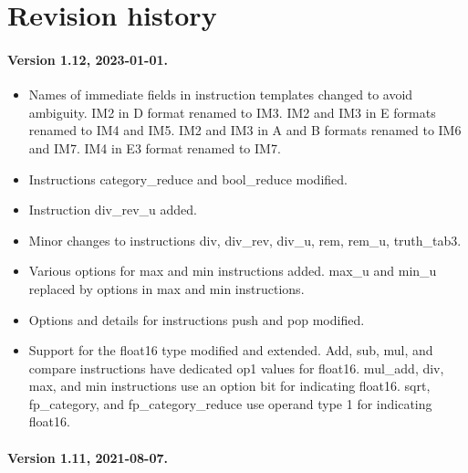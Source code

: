 \documentclass[forwardcom.tex]{subfiles}
\begin{document}
\RaggedRight

\chapter{Revision history}

\subsubsection{Version 1.12, 2023-01-01.}
\begin{itemize}
\item Names of immediate fields in instruction templates changed to avoid ambiguity. IM2 in D format renamed to IM3. IM2 and IM3 in E formats renamed to IM4 and IM5. IM2 and IM3 in A and B formats renamed to IM6 and IM7. IM4 in E3 format renamed to IM7.
\item Instructions category\_reduce and bool\_reduce modified.
\item Instruction div\_rev\_u added.
\item Minor changes to instructions div, div\_rev, div\_u, rem, rem\_u, truth\_tab3.
\item Various options for max and min instructions added. max\_u and min\_u replaced by options in max and min instructions.
\item Options and details for instructions push and pop modified.
\item Support for the float16 type modified and extended. Add, sub, mul, and compare instructions have dedicated op1 values for float16. mul\_add, div, max, and min instructions use an option bit for indicating float16. sqrt, fp\_category, and fp\_category\_reduce use operand type 1 for indicating float16.

\end{itemize}

\subsubsection{Version 1.11, 2021-08-07.}
\end{document}
